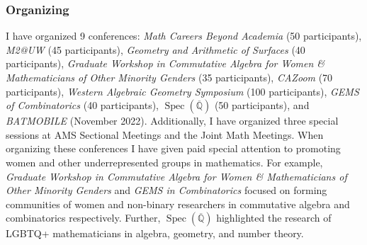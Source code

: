 \documentclass[11pt,reqno]{amsart}
\theoremstyle{remark}
\newcommand{\Spec}{\operatorname{Spec}}
\newcommand{\Q}{\mathbb{Q}}
\begin{document}
\subsubsection{Organizing}\label{subsubsec:prior-organizing} I have organized 9 conferences: \textit{Math Careers Beyond Academia } (50 participants), \textit{M2@UW} (45 participants), \textit{Geometry and Arithmetic of Surfaces} (40 participants), \textit{Graduate Workshop in Commutative Algebra for Women \& Mathematicians of Other Minority Genders} (35 participants), \textit{CAZoom} (70 participants), \textit{Western Algebraic Geometry Symposium} (100 participants), \textit{GEMS of Combinatorics} (40 participants), $\Spec(\overline{\Q})$ (50 participants), and \textit{BATMOBILE} (November 2022). Additionally, I have organized three special sessions at AMS Sectional Meetings and the Joint Math Meetings. When organizing these conferences I have given paid special attention to promoting women and other underrepresented groups in mathematics. For example, \textit{Graduate Workshop in Commutative Algebra for Women \& Mathematicians of Other Minority Genders} and \textit{GEMS in Combinatorics}  focused on forming communities of women and non-binary researchers in commutative algebra and combinatorics respectively. Further, $\Spec(\overline{\Q})$ highlighted the research of LGBTQ+ mathematicians in algebra, geometry, and number theory.


\end{document}
